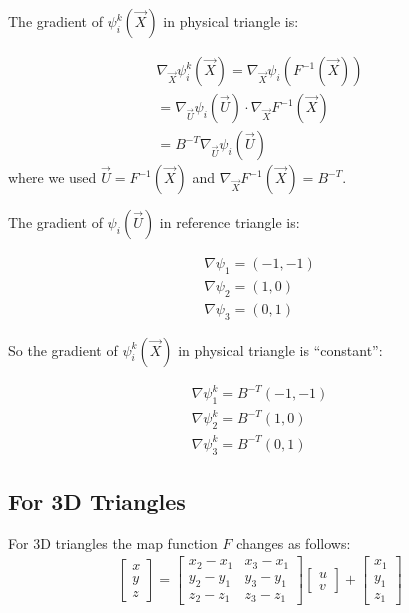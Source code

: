 \documentclass{birkjour}
\numberwithin{equation}{section}
\begin{document}
The gradient of $\psi^k_i(\vec X)$ in physical triangle is:

\begin{eqnarray} 
	\nabla_{\vec X} \psi^k_i(\vec X) = \nabla_{\vec X} \psi_i( F^{-1}(\vec X) ) \nonumber\\
    = \nabla_{\vec U} \psi_i( \vec U ) \cdot \nabla_{\vec X} F^{-1}(\vec X) \nonumber\\
    = B^{-T} \nabla_{\vec U} \psi_i( \vec U) \nonumber
\end{eqnarray}
where we used $\vec U = F^{-1}(\vec X)$ and $\nabla_{\vec X} F^{-1}(\vec X) = B^{-T}$.

The gradient of $\psi_i(\vec U)$ in reference triangle is:

\begin{eqnarray} 
	\nabla \psi_1 = (-1, -1) \nonumber\\
	\nabla \psi_2 = (1, 0) \nonumber\\
	\nabla \psi_3 = (0, 1) \nonumber
\end{eqnarray}

So the gradient of $\psi^k_i(\vec X)$ in physical triangle is ``constant'':
 
\begin{eqnarray} 
	\nabla \psi^k_1 = B^{-T} (-1, -1) \nonumber\\
	\nabla \psi^k_2 = B^{-T} (1, 0) \nonumber\\
	\nabla \psi^k_3 = B^{-T} (0, 1) \nonumber
\end{eqnarray}

\subsection{For 3D Triangles}

For 3D triangles the map function $F$ changes as follows:
\begin{eqnarray}
	\left[\begin{array}{c}
		x \\
		y \\
		z
	\end{array}\right] = 
	\left[\begin{array}{cc}
		x_2 - x_1 &  x_3 - x_1 \\
		y_2 - y_1 &  y_3 - y_1 \\
		z_2 - z_1 &  z_3 - z_1
	\end{array}\right] 
	\left[\begin{array}{c}
		u \\
		v
	\end{array}\right] +
	\left[\begin{array}{c}
		x_1 \\
		y_1 \\
		z_1
	\end{array}\right] \nonumber
\end{eqnarray}
\end{document}
